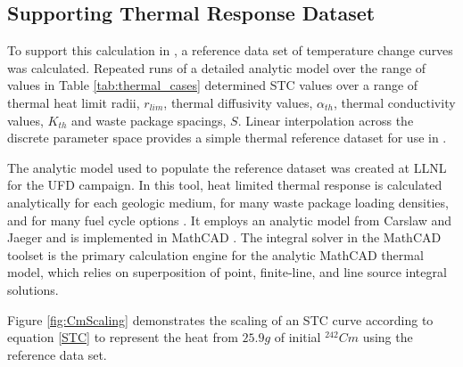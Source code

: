 \subsection{Supporting Thermal Response Dataset}
To support this calculation in \Cyder, a reference data set of temperature change 
curves was calculated. Repeated runs of a detailed analytic model over the range of values in Table 
\ref{tab:thermal_cases} determined \gls{STC} values over a range of thermal 
heat limit radii, $r_{lim}$, thermal diffusivity values, $\alpha_{th}$,
thermal conductivity values, $K_{th}$ and waste package spacings, $S$. Linear 
interpolation across the discrete parameter space provides a simple thermal 
reference dataset for use in \Cyder.



The analytic model used to populate the reference dataset was created at 
\gls{LLNL} for the \gls{UFD} campaign. In this tool, heat limited thermal 
response is calculated analytically for each geologic medium, for many waste package 
loading densities, and for many fuel cycle options \cite{hardin_generic_2011, 
greenberg_investigations_2012, greenberg_application_2012}. It employs an 
analytic model from Carslaw and Jaeger and is implemented in MathCAD 
\cite{carslaw_conduction_1959, ptc_mathcad_2010}.  The integral solver in the 
MathCAD toolset is the primary calculation engine for the analytic MathCAD 
thermal model, which relies on superposition of point, finite-line, and line 
source integral solutions.  

%

Figure \ref{fig:CmScaling} demonstrates the scaling of an STC curve according to 
equation \eqref{STC} to represent the heat from $25.9g$ of initial $^{242}Cm$ using 
the reference data set. 

